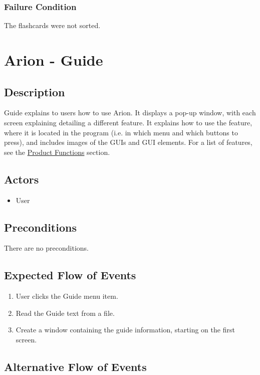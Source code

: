 \documentclass{scrreprt}
\begin{document}
    \subsection{Failure Condition}
    The flashcards were not sorted.


\chapter{Arion - Guide}

\section{Description}
Guide explains to users how to use Arion.
It displays a pop-up window, with each screen explaining detailing a different feature.
It explains how to use the feature, where it is located in the program (i.e. in which menu and which buttons to press), and includes images of the GUIs and GUI elements.
For a list of features, see the \hyperref[sec:Product Functions]{Product Functions} section.

\section{Actors}
\begin{itemize}
    \item User
\end{itemize}

\section{Preconditions}
There are no preconditions.

\section{Expected Flow of Events}
\begin{enumerate}[1.]
    \item User clicks the Guide menu item.
    \item Read the Guide text from a file.
    \item Create a window containing the guide information, starting on the first screen.
\end{enumerate}

\section{Alternative Flow of Events}
\end{document}

